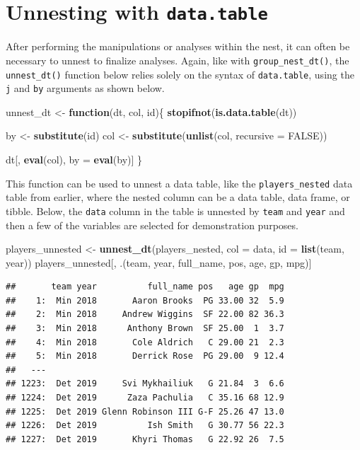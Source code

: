 \documentclass[doc,floatsintext]{apa6}
\newenvironment{Shaded}{\begin{snugshade}}{\end{snugshade}}
\newcommand{\ControlFlowTok}[1]{\textcolor[rgb]{0.13,0.29,0.53}{\textbf{#1}}}
\newcommand{\DataTypeTok}[1]{\textcolor[rgb]{0.13,0.29,0.53}{#1}}
\newcommand{\KeywordTok}[1]{\textcolor[rgb]{0.13,0.29,0.53}{\textbf{#1}}}
\newcommand{\NormalTok}[1]{#1}
\newcommand{\OtherTok}[1]{\textcolor[rgb]{0.56,0.35,0.01}{#1}}
\newcommand{\StringTok}[1]{\textcolor[rgb]{0.31,0.60,0.02}{#1}}
\begin{document}
\hypertarget{unnesting-with-data.table}{%
\section{\texorpdfstring{Unnesting with \texttt{data.table}}{Unnesting with data.table}}\label{unnesting-with-data.table}}

After performing the manipulations or analyses within the nest, it can often be necessary to unnest to finalize analyses. Again, like with \texttt{group\_nest\_dt()}, the \texttt{unnest\_dt()} function below relies solely on the syntax of \texttt{data.table}, using the \texttt{j} and \texttt{by} arguments as shown below.

\begin{Shaded}
\begin{Highlighting}[]
\NormalTok{unnest_dt <-}\StringTok{ }\ControlFlowTok{function}\NormalTok{(dt, col, id)\{}
  \KeywordTok{stopifnot}\NormalTok{(}\KeywordTok{is.data.table}\NormalTok{(dt))}
  
\NormalTok{  by <-}\StringTok{ }\KeywordTok{substitute}\NormalTok{(id)}
\NormalTok{  col <-}\StringTok{ }\KeywordTok{substitute}\NormalTok{(}\KeywordTok{unlist}\NormalTok{(col, }\DataTypeTok{recursive =} \OtherTok{FALSE}\NormalTok{))}
  
\NormalTok{  dt[, }\KeywordTok{eval}\NormalTok{(col), by =}\StringTok{ }\KeywordTok{eval}\NormalTok{(by)]}
\NormalTok{\}}
\end{Highlighting}
\end{Shaded}

This function can be used to unnest a data table, like the \texttt{players\_nested} data table from earlier, where the nested column can be a data table, data frame, or tibble. Below, the \texttt{data} column in the table is unnested by \texttt{team} and \texttt{year} and then a few of the variables are selected for demonstration purposes.

\begin{Shaded}
\begin{Highlighting}[]
\NormalTok{players_unnested <-}\StringTok{ }\KeywordTok{unnest_dt}\NormalTok{(players_nested, }
          \DataTypeTok{col =}\NormalTok{ data, }
          \DataTypeTok{id =} \KeywordTok{list}\NormalTok{(team, year))}
\NormalTok{players_unnested[, .(team, year, full_name, pos, age, gp, mpg)]}
\end{Highlighting}
\end{Shaded}

\begin{verbatim}
##       team year          full_name pos   age gp  mpg
##    1:  Min 2018       Aaron Brooks  PG 33.00 32  5.9
##    2:  Min 2018     Andrew Wiggins  SF 22.00 82 36.3
##    3:  Min 2018      Anthony Brown  SF 25.00  1  3.7
##    4:  Min 2018       Cole Aldrich   C 29.00 21  2.3
##    5:  Min 2018       Derrick Rose  PG 29.00  9 12.4
##   ---                                               
## 1223:  Det 2019     Svi Mykhailiuk   G 21.84  3  6.6
## 1224:  Det 2019      Zaza Pachulia   C 35.16 68 12.9
## 1225:  Det 2019 Glenn Robinson III G-F 25.26 47 13.0
## 1226:  Det 2019          Ish Smith   G 30.77 56 22.3
## 1227:  Det 2019       Khyri Thomas   G 22.92 26  7.5
\end{verbatim}
\end{document}
